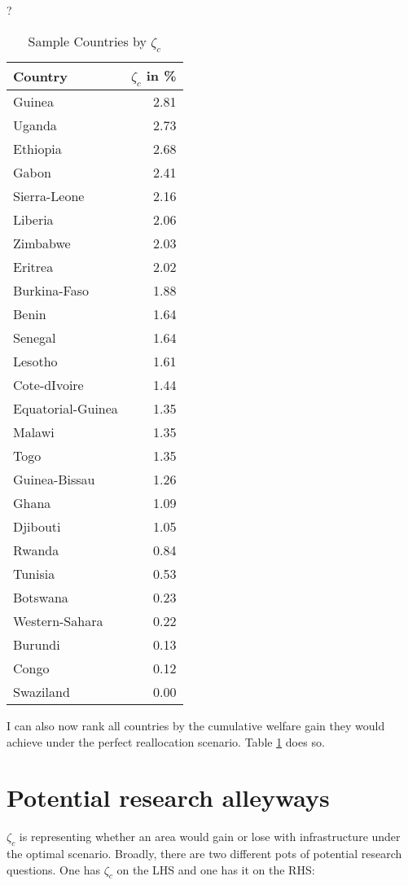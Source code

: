 \documentclass[11pt, oneside]{article}   	%
\begin{document}
?
\begin{table}[ht]
\centering
\caption{Sample Countries by $\zeta_{c}$}
\begin{tabular}{lr}
  \hline
Country & $\zeta_{c}$ in \% \\
  \hline
  Guinea & 2.81 \\
    Uganda & 2.73 \\
    Ethiopia & 2.68 \\
    Gabon & 2.41 \\
    Sierra-Leone & 2.16 \\
    Liberia & 2.06 \\
    Zimbabwe & 2.03 \\
    Eritrea & 2.02 \\
    Burkina-Faso & 1.88 \\
    Benin & 1.64 \\
    Senegal & 1.64 \\
    Lesotho & 1.61 \\
    Cote-dIvoire & 1.44 \\
    Equatorial-Guinea & 1.35 \\
    Malawi & 1.35 \\
    Togo & 1.35 \\
    Guinea-Bissau & 1.26 \\
    Ghana & 1.09 \\
    Djibouti & 1.05 \\
    Rwanda & 0.84 \\
    Tunisia & 0.53 \\
    Botswana & 0.23 \\
    Western-Sahara & 0.22 \\
    Burundi & 0.13 \\
    Congo & 0.12 \\
    Swaziland & 0.00 \\
     \hline
  \end{tabular}
  \label{tab:national_zeta}
  \end{table}




I can also now rank all countries by the cumulative welfare gain they would achieve under the perfect reallocation scenario. Table \ref{tab:national_zeta} does so.

\section{Potential research alleyways}
$\zeta_{c}$ is representing whether an area would gain or lose with infrastructure under the optimal scenario. Broadly, there are two different pots of potential research questions. One has $\zeta_{c}$ on the LHS and one has it on the RHS:
\end{document}
